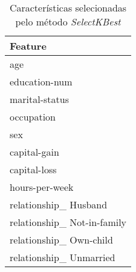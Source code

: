 \begin{table}
\centering
\caption{Características selecionadas pelo método \textit{SelectKBest}}
\begin{tabular}{l}
\toprule
                     Feature \\
\midrule
                         age \\
               education-num \\
              marital-status \\
                  occupation \\
                         sex \\
                capital-gain \\
                capital-loss \\
              hours-per-week \\
       relationship\_ Husband \\
 relationship\_ Not-in-family \\
     relationship\_ Own-child \\
     relationship\_ Unmarried \\
\bottomrule
\end{tabular}
\end{table}
